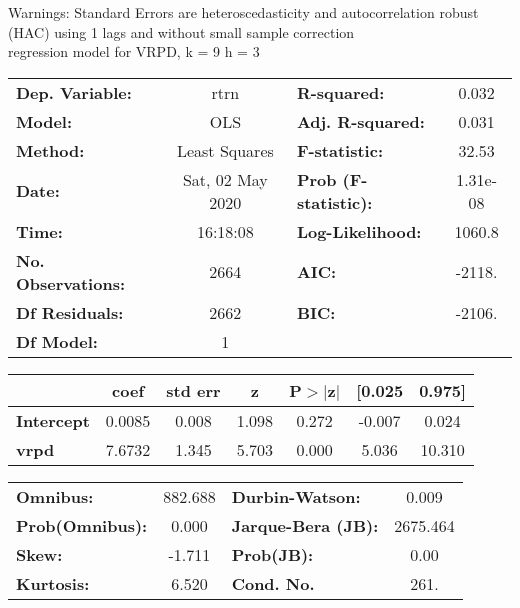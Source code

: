Warnings: \newline
 [1] Standard Errors are heteroscedasticity and autocorrelation robust (HAC) using 1 lags and without small sample correction\\ 

regression model for VRPD, k = 9 h = 3\begin{center}
\begin{tabular}{lclc}
\toprule
\textbf{Dep. Variable:}    &       rtrn       & \textbf{  R-squared:         } &     0.032   \\
\textbf{Model:}            &       OLS        & \textbf{  Adj. R-squared:    } &     0.031   \\
\textbf{Method:}           &  Least Squares   & \textbf{  F-statistic:       } &     32.53   \\
\textbf{Date:}             & Sat, 02 May 2020 & \textbf{  Prob (F-statistic):} &  1.31e-08   \\
\textbf{Time:}             &     16:18:08     & \textbf{  Log-Likelihood:    } &    1060.8   \\
\textbf{No. Observations:} &        2664      & \textbf{  AIC:               } &    -2118.   \\
\textbf{Df Residuals:}     &        2662      & \textbf{  BIC:               } &    -2106.   \\
\textbf{Df Model:}         &           1      & \textbf{                     } &             \\
\bottomrule
\end{tabular}
\begin{tabular}{lcccccc}
                   & \textbf{coef} & \textbf{std err} & \textbf{z} & \textbf{P$> |$z$|$} & \textbf{[0.025} & \textbf{0.975]}  \\
\midrule
\textbf{Intercept} &       0.0085  &        0.008     &     1.098  &         0.272        &       -0.007    &        0.024     \\
\textbf{vrpd}      &       7.6732  &        1.345     &     5.703  &         0.000        &        5.036    &       10.310     \\
\bottomrule
\end{tabular}
\begin{tabular}{lclc}
\textbf{Omnibus:}       & 882.688 & \textbf{  Durbin-Watson:     } &    0.009  \\
\textbf{Prob(Omnibus):} &   0.000 & \textbf{  Jarque-Bera (JB):  } & 2675.464  \\
\textbf{Skew:}          &  -1.711 & \textbf{  Prob(JB):          } &     0.00  \\
\textbf{Kurtosis:}      &   6.520 & \textbf{  Cond. No.          } &     261.  \\
\bottomrule
\end{tabular}
\end{center}

